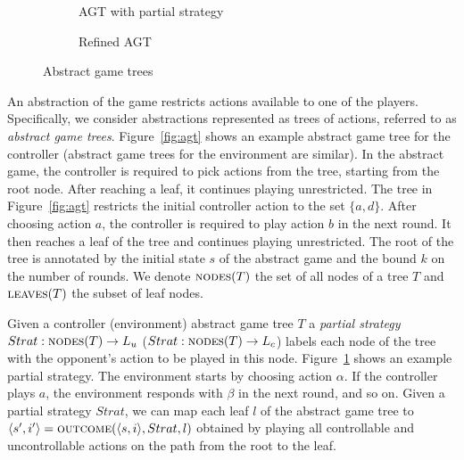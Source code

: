 \documentclass{llncs}
\begin{document}
\begin{figure}
\begin{subfigure}[t]{.32\textwidth}
        \captionsetup{width=.8\textwidth}
        \caption{AGT with partial strategy}
        \label{fig:strategy}
    \end{subfigure}%
    \begin{subfigure}[t]{.32\textwidth}
        \centering
        \captionsetup{width=.8\textwidth}
        \caption{Refined AGT}
        \label{fig:refined}
    \end{subfigure}
    \caption{Abstract game trees}
    \label{fig:alltrees}
\end{figure}

An abstraction of the game restricts actions available to one of the players.
Specifically, we consider abstractions represented as trees of actions,
referred to as \emph{abstract game trees}.  Figure~\ref{fig:agt} shows an example abstract game
tree for the controller (abstract game trees for the environment are similar).  In the abstract game, 
the controller is required to pick actions
from the tree, starting from the root node.  After reaching a leaf, it
continues playing unrestricted.  The tree in Figure~\ref{fig:agt} restricts the
initial controller action to the set $\{a, d\}$.  After choosing action $a$,
the controller is required to play action $b$ in the next round.  It then reaches a leaf 
of the tree and continues playing unrestricted.
The root of the tree is annotated by the initial state $s$ of the abstract game and the 
bound $k$ on the number of rounds. 
We denote $\textsc{nodes}(T)$ the set of all nodes of a tree $T$ and
$\textsc{leaves}(T)$ the subset of leaf nodes.  

Given a controller (environment)
abstract game tree $T$ a \emph{partial strategy} $Strat: \textsc{nodes}(T) \rightarrow L_u$ 
($Strat: \textsc{nodes}(T) \rightarrow L_c$) labels each node of the tree with the opponent's
action to be played in this node.   
Figure~\ref{fig:strategy} shows an example partial strategy.  The environment 
starts by choosing action $\alpha$.  If the controller plays $a$, the
environment responds with $\beta$ in the next round, and so on. Given a partial
strategy $Strat$, we can map each leaf $l$ of the abstract game tree to
$\langle s',i'\rangle=\textsc{outcome}(\langle s, i\rangle, Strat, l)$ obtained
by playing all controllable and uncontrollable actions on the path from the
root to the leaf.
\end{document}
